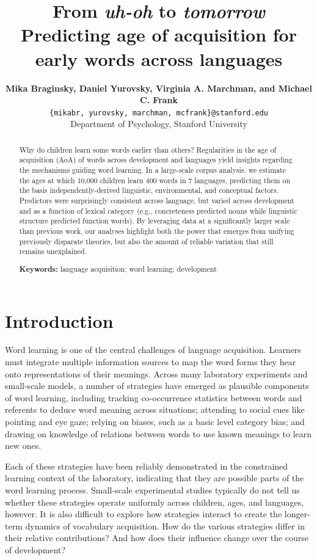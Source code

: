 \documentclass[10pt, letterpaper]{article}
\title{From \emph{uh-oh} to \emph{tomorrow}\\Predicting age of acquisition for
early words across languages}
\author{{\large \bf Mika Braginsky, Daniel Yurovsky, Virginia A. Marchman, and Michael C. Frank} \\ \texttt{\{mikabr, yurovsky, marchman, mcfrank\}@stanford.edu} \\ Department of Psychology, Stanford University}
\begin{document}
\maketitle

\begin{abstract}
Why do children learn some words earlier than others? Regularities in
the age of acquisition (AoA) of words across development and languages
yield insights regarding the mechanisms guiding word learning. In a
large-scale corpus analysis, we estimate the ages at which 10,000
children learn 400 words in 7 languages, predicting them on the basis
independently-derived linguistic, environmental, and conceptual factors.
Predictors were surprisingly consistent across language, but varied
across development and as a function of lexical category (e.g.,
concreteness predicted nouns while linguistic structure predicted
function words). By leveraging data at a significantly larger scale than
previous work, our analyses highlight both the power that emerges from
unifying previously disparate theories, but also the amount of reliable
variation that still remains unexplained.

\textbf{Keywords:}
language acquisition; word learning; development
\end{abstract}

\setlength{\dbltextfloatsep}{10pt plus 1.0pt minus 2.0pt}

\section{Introduction}\label{introduction}

Word learning is one of the central challenges of language acquisition.
Learners must integrate multiple information sources to map the word
forms they hear onto representations of their meanings. Across many
laboratory experiments and small-scale models, a number of strategies
have emerged as plausible components of word learning, including
tracking co-occurrence statistics between words and referents to deduce
word meaning across situations; attending to social cues like pointing
and eye gaze; relying on biases, such as a basic level category bias;
and drawing on knowledge of relations between words to use known
meanings to learn new ones.

Each of these strategies have been reliably demonstrated in the
constrained learning context of the laboratory, indicating that they are
possible parts of the word learning process. Small-scale experimental
studies typically do not tell us whether these strategies operate
uniformly across children, ages, and languages, however. It is also
difficult to explore how strategies interact to create the longer-term
dynamics of vocabulary acquisition. How do the various strategies differ
in their relative contributions? And how does their influence change
over the course of development?
\end{document}
